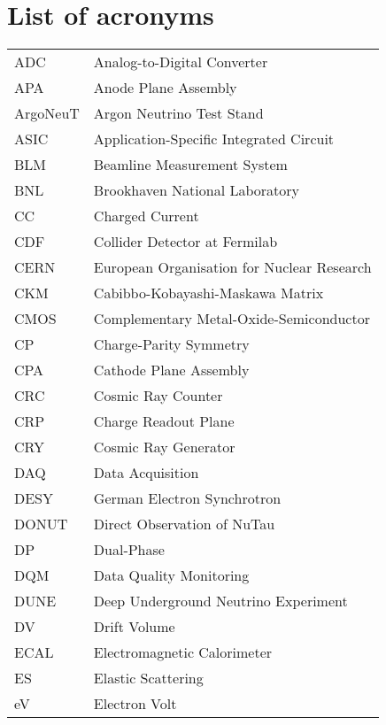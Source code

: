 
\chapter*{List of acronyms}

\begin{longtable}{l p{11cm}}
ADC         & Analog-to-Digital Converter \\
APA         & Anode Plane Assembly \\
ArgoNeuT    & Argon Neutrino Test Stand \\
ASIC        & Application-Specific Integrated Circuit \\
BLM         & Beamline Measurement System \\
BNL         & Brookhaven National Laboratory \\
CC          & Charged Current \\
CDF         & Collider Detector at Fermilab \\
CERN        & European Organisation for Nuclear Research \\
CKM         & Cabibbo-Kobayashi-Maskawa Matrix \\
CMOS        & Complementary Metal-Oxide-Semiconductor \\
CP          & Charge-Parity Symmetry \\
CPA         & Cathode Plane Assembly \\
CRC         & Cosmic Ray Counter \\
CRP         & Charge Readout Plane \\
CRY         & Cosmic Ray Generator \\
DAQ         & Data Acquisition \\
DESY        & German Electron Synchrotron \\
DONUT       & Direct Observation of NuTau \\
DP          & Dual-Phase \\
DQM         & Data Quality Monitoring \\
DUNE        & Deep Underground Neutrino Experiment \\
DV          & Drift Volume \\
ECAL        & Electromagnetic Calorimeter \\
ES          & Elastic Scattering \\
eV          & Electron Volt \\

\end{longtable}
